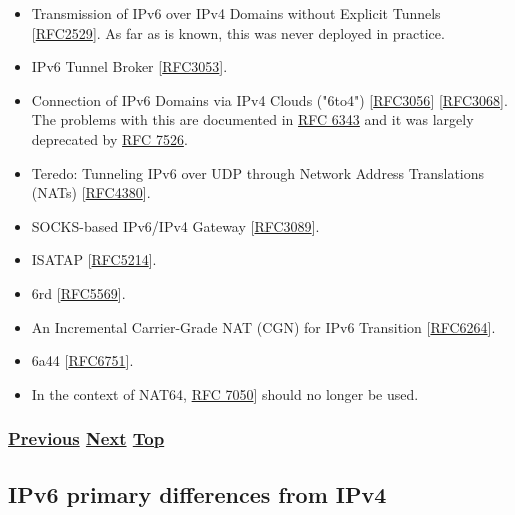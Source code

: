 \documentclass[
]{article}
\begin{document}
\begin{itemize}
\item
  Transmission of IPv6 over IPv4 Domains without Explicit Tunnels
  {[}\href{https://www.rfc-editor.org/info/rfc2529}{RFC2529}{]}. As far
  as is known, this was never deployed in practice.
\item
  IPv6 Tunnel Broker
  {[}\href{https://www.rfc-editor.org/info/rfc3053}{RFC3053}{]}.
\item
  Connection of IPv6 Domains via IPv4 Clouds ("6to4")
  {[}\href{https://www.rfc-editor.org/info/rfc3056}{RFC3056}{]}
  {[}\href{https://www.rfc-editor.org/info/rfc3068}{RFC3068}{]}. The
  problems with this are documented in
  \href{https://www.rfc-editor.org/info/rfc6343}{RFC 6343} and it was
  largely deprecated by
  \href{https://www.rfc-editor.org/info/rfc7526}{RFC 7526}.
\item
  Teredo: Tunneling IPv6 over UDP through Network Address Translations
  (NATs) {[}\href{https://www.rfc-editor.org/info/rfc4380}{RFC4380}{]}.
\item
  SOCKS-based IPv6/IPv4 Gateway
  {[}\href{https://www.rfc-editor.org/info/rfc3089}{RFC3089}{]}.
\item
  ISATAP {[}\href{https://www.rfc-editor.org/info/rfc5214}{RFC5214}{]}.
\item
  6rd {[}\href{https://www.rfc-editor.org/info/rfc5569}{RFC5569}{]}.
\item
  An Incremental Carrier-Grade NAT (CGN) for IPv6 Transition
  {[}\href{https://www.rfc-editor.org/info/rfc6264}{RFC6264}{]}.
\item
  6a44 {[}\href{https://www.rfc-editor.org/info/rfc6751}{RFC6751}{]}.
\item
  In the context of NAT64,
  \href{https://www.rfc-editor.org/info/rfc7050}{RFC 7050}{]} should no
  longer be used.
\end{itemize}

\subsubsection{\texorpdfstring{\hyperref[translation-and-ipv4-as-a-service]{Previous}
\hyperref[ipv6-primary-differences-from-ipv4]{Next}
\hyperref[coexistence-with-legacy-ipv4]{Top}}{Previous Next Top}}\label{previous-next-top-21}

\pagebreak

\subsection{IPv6 primary differences from
IPv4}\label{ipv6-primary-differences-from-ipv4}
\end{document}
